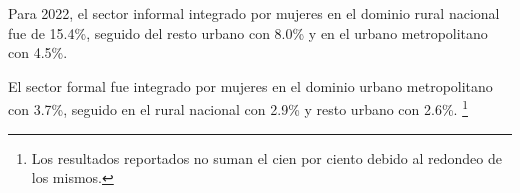 Para 2022, el  sector informal integrado por mujeres en el dominio rural nacional fue de 15.4\%, seguido del resto urbano con 8.0\% y en el urbano metropolitano con 4.5\%. 

El sector formal fue integrado por mujeres en el dominio urbano metropolitano con 3.7\%, seguido en el rural nacional con 2.9\% y resto urbano con 2.6\%. \footnote{Los resultados reportados no suman el cien por ciento debido al redondeo de los mismos.}